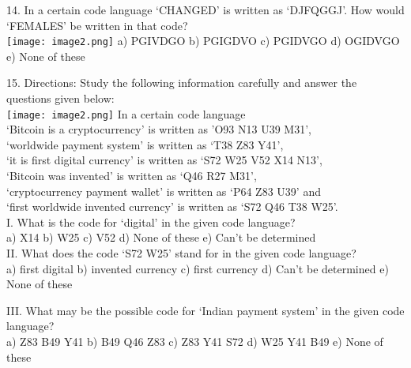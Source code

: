 \documentclass[
]{article}
\begin{document}
14. In a certain code language ‘CHANGED’ is written as ‘DJFQGGJ’. How would ‘FEMALES’ be written in that code?\\
\texttt{[image: image2.png]}
a) PGIVDGO \hspace{1mm} b) PGIGDVO \hspace{1mm} c) PGIDVGO \hspace{1mm} d) OGIDVGO \hspace{1mm} e) None of these

15. Directions: Study the following information carefully and answer the questions given below:\\
\texttt{[image: image2.png]}
In a certain code language\\
‘Bitcoin is a cryptocurrency’ is written as ’O93 N13 U39 M31’,\\
‘worldwide payment system’ is written as ‘T38 Z83 Y41’,\\
‘it is first digital currency’ is written as ‘S72 W25 V52 X14 N13’,\\
‘Bitcoin was invented’ is written as ‘Q46 R27 M31’,\\
‘cryptocurrency payment wallet’ is written as ‘P64 Z83 U39’ and\\
‘first worldwide invented currency’ is written as ‘S72 Q46 T38 W25’.\\

I. What is the code for ‘digital’ in the given code language?\\
a) X14 \hspace{1mm} b) W25 \hspace{1mm} c) V52 \hspace{1mm} d) None of these \hspace{1mm} e) Can’t be determined\\

II. What does the code ‘S72 W25’ stand for in the given code language?\\
a) first digital \hspace{1mm} b) invented currency \hspace{1mm} c) first currency \hspace{1mm} d) Can’t be determined \hspace{1mm} e) None of these

III. What may be the possible code for ‘Indian payment system’ in the given code language?\\
a) Z83 B49 Y41 \hspace{1mm} b) B49 Q46 Z83 \hspace{1mm} c) Z83 Y41 S72
\hspace{1mm} d) W25 Y41 B49 \hspace{1mm} e) None of these
\end{document}
